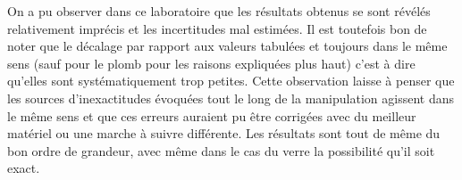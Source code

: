 On a pu observer dans ce laboratoire que les résultats obtenus se sont révélés relativement imprécis et les incertitudes mal estimées.
Il est toutefois bon de noter que le décalage par rapport aux valeurs tabulées et toujours dans le même sens (sauf pour le plomb pour les raisons expliquées plus haut) c'est à dire qu'elles sont systématiquement trop petites.
Cette observation laisse à penser que les sources d'inexactitudes évoquées tout le long de la manipulation agissent dans le même sens et que ces erreurs auraient pu être corrigées avec du meilleur matériel ou une marche à suivre différente.
Les résultats sont tout de même du bon ordre de grandeur, avec même dans le cas du verre la possibilité qu'il soit exact.
